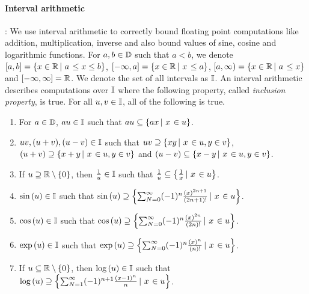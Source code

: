\paragraph{Interval arithmetic}:  We use interval arithmetic to
correctly bound floating point computations like addition,
multiplication, inverse and also bound values of sine, cosine and
logarithmic functions. For $a,b\in\mathbb{D}$ such that $a<b$, we
denote\\ $\left[a,b\right] = \left\{x\in\mathbb{R}\left|~a\right.\leq x\leq b\right\}$,
$[-\infty,a] = \left\{x\in\mathbb{R}\left|~x\right.\leq a\right\}$, $[a,\infty)
= \left\{x\in\mathbb{R}\left|~a\right.\leq x\right\}$ and $[-\infty,\infty] = \mathbb{R}$.  We
denote the set of all intervals as $\mathbb{I}$.  An interval
arithmetic describes computations over $\mathbb{I}$ where the
following property, called \emph{inclusion property}, is true.  For
all $u,v\in\mathbb{I}$, all of the following is true.
%
\begin{enumerate}
\item For $a\in\mathbb{D}$, $au\in\mathbb{I}$ such that $au\subseteq \left\{ax\left|~x\right.\in u\right\}$.
\item $uv,(u+v),(u-v)\in\mathbb{I}$ such that
$uv\supseteq\left\{xy\left|~x\right.\in u, y\in v\right\}$,\\ $\left(u+v\right)\supseteq\left\{x+y\left|~x\right.\in
u, y\in v\right\}$ and $\left(u-v\right)\subseteq\left\{x-y\left|~x\right.\in u, y\in v\right\}$.
\item If $u\supseteq\mathbb{R}\setminus\left\{0\right\}$, then $\frac{1}{u}\in\mathbb{I}$ such that $\frac{1}{u}\subseteq\left\{\frac{1}{x}\left|~x\right.\in u\right\}$.
\item $\sin\left(u\right)\in\mathbb{I}$ such that $\sin\left(u\right)\supseteq\left\{\sum_{N=0}^\infty(-1)^n\frac{\left(x\right)^{2n+1}}{\left(2n+1\right)!}\left|~x\right.\in u\right\}$.
\item $\cos\left(u\right)\in\mathbb{I}$ such that $\cos\left(u\right)\supseteq\left\{\sum_{N=0}^\infty (-1)^n\frac{\left(x\right)^{2n}}{\left(2n\right)!}\left|~x\right.\in u\right\}$.
\item $\exp\left(u\right)\in\mathbb{I}$ such that $\exp\left(u\right)\supseteq\left\{\sum_{N=0}^\infty(-1)^n\frac{\left(x\right)^{n}}{\left(n\right)!}\left|~x\right.\in u\right\}$.
\item If $u\subseteq\mathbb{R}\setminus\left\{0\right\}$, then $\log\left(u\right)\in\mathbb{I}$ such that\\ $\log\left(u\right)\supseteq\left\{\sum_{N=1}^\infty(-1)^{n+1}\frac{\left(x-1\right)^{n}}{n}\left|~x\right.\in u\right\}$.
\end{enumerate}
%

